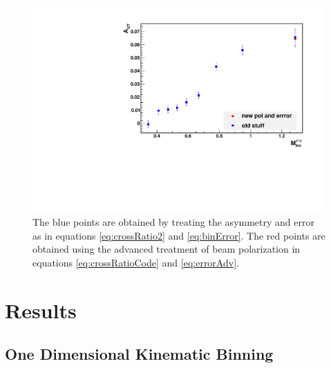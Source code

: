 \documentclass[abstract = on,listof=totoc, bibliography=totoc]{scrreprt}
\begin{document}
\begin{figure}
\begin{center}
\includegraphics[width = .7\textwidth]{polarizationErrorTestM}
\caption[Comparison of Error Bars]{The blue points are obtained by treating the asymmetry and error as in equations \ref{eq:crossRatio2} and \ref{eq:binError}. The red points are obtained using the advanced treatment of beam polarization in equations \ref{eq:crossRatioCode} and \ref{eq:errorAdv}.}
\label{fig:advPolTreat}
\end{center}
\end{figure}








 



















\chapter{Results}
\section{One Dimensional Kinematic Binning}
\end{document}
